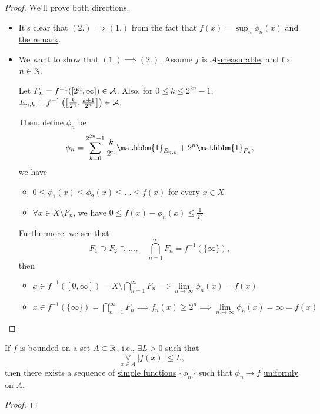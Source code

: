 \begin{proof}
	We'll prove both directions.
	\begin{itemize}
		\item It's clear that \((2.)\implies (1.)\) from the fact that \(f(x) = \sup_n \phi _{n}(x)\) and \hyperref[rmk:Operations-preserve-measurability]{the remark}.
		\item We want to show that \((1.)\implies (2.)\). Assume \(f\) is \hyperref[def:A-measurable-function]{\(\mathcal{\MakeUppercase{a}} \)-measurable}, and fix \(n\in\mathbb{\MakeUppercase{n}} \).

		      \par Let \(F_{n} =f^{-1} ([2^n, \infty ])\in \mathcal{\MakeUppercase{a}}\). Also, for \(0\leq k\leq 2^{2n}-1\), \(E_{n, k} = f^{-1} \left(\left[\frac{k}{2^n}, \frac{k+1}{2^n}\right]\right)\in \mathcal{\MakeUppercase{a}} \).

		      \par Then, define \(\phi _{n}\) be
		      \[
			      \phi _{n} = \sum\limits_{k=0}^{2^{2n} - 1}\frac{k}{2^n}\mathbbm{1}_{E_{n, k}}  + 2^n \mathbbm{1}_{F_n},
		      \]
		      we have
		      \begin{itemize}
			      \item \(0\leq \phi _1(x)\leq \phi _2(x)\leq \ldots \leq f(x) \) for every \(x\in X\)
			      \item \(\forall x\in X\setminus F_{n}\), we have \(0\leq f(x) - \phi _{n}(x)\leq \frac{1}{2^n}\)
		      \end{itemize}

		      \par Furthermore, we see that
		      \[
			      F_1\supset F_2\supset \ldots ,\quad \bigcap\limits_{n=1}^{\infty} F_{n} = f^{-1} (\{\infty \}),
		      \]
		      then
		      \begin{itemize}
			      \item \(x\in f^{-1} ([0, \infty ]) = X\setminus \bigcap\limits_{n=1}^{\infty} F_{n} \implies \lim\limits_{n \to \infty} \phi _{n}(x) = f(x)\)
			      \item \(x\in f^{-1} (\{\infty \}) = \bigcap\limits_{n=1}^{\infty} F_{n}\implies f_{n}(x)\geq 2^n \implies \lim\limits_{n \to \infty} \phi _{n}(x) = \infty = f(x)\)
		      \end{itemize}
	\end{itemize}
\end{proof}

\begin{corollary}
	If \(f\) is bounded on a set \(A\subset \mathbb{\MakeUppercase{r}} \), i.e., \(\exists L > 0 \) such that
	\[
		\underset{x\in A}{\forall }\ \left\vert f(x) \right\vert \leq L,
	\]
	then there exists a sequence of \hyperref[def:simple-function]{simple functions} \(\{\phi _{n}\}\) such that \(\phi _{n}\to f \)
	\underline{\hyperref[def:uniformly-convergence]{uniformly} on \(A\)}.
\end{corollary}
\begin{proof}
\end{proof}

